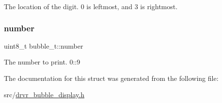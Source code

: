 The location of the digit. 0 is leftmost, and 3 is rightmost. \mbox{\label{structbubble__t_a73771648a59844fc109bd68e4a1a44de}} 
\subsubsection{\texorpdfstring{number}{number}}
{\footnotesize\ttfamily uint8\+\_\+t bubble\+\_\+t\+::number}

The number to print. 0\+::9 

The documentation for this struct was generated from the following file\+:\begin{DoxyCompactItemize}
\item 
src/\mbox{\hyperlink{drvr__bubble__display_8h}{drvr\+\_\+bubble\+\_\+display.\+h}}\end{DoxyCompactItemize}
